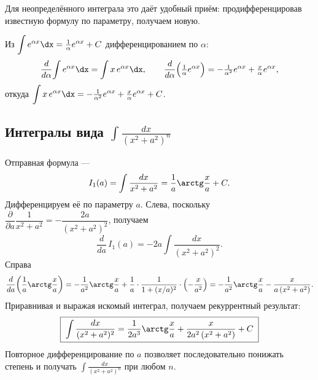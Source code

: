 \noindent Для неопределённого интеграла это даёт удобный приём: продифференцировав известную формулу
по параметру, получаем новую.

\begin{example}
Из $\displaystyle\int e^{\alpha x}\dx=\tfrac1\alpha e^{\alpha x}+C$ дифференцированием по $\alpha$:
\[
  \frac{d}{d\alpha}\!\int e^{\alpha x}\dx=\int x\,e^{\alpha x}\dx,
  \qquad
  \frac{d}{d\alpha}\Bigl(\tfrac1\alpha e^{\alpha x}\Bigr)=-\tfrac1{\alpha^2}e^{\alpha x}+\tfrac{x}{\alpha}e^{\alpha x},
\]
откуда $\displaystyle\int x\,e^{\alpha x}\dx=-\tfrac1{\alpha^2}e^{\alpha x}+\tfrac{x}{\alpha}e^{\alpha x}+C$.
\end{example}

\subsection{Интегралы вида $\displaystyle\int\frac{dx}{(x^2+a^2)^n}$}
Отправная формула —
\[
  I_1(a)=\int\frac{dx}{x^2+a^2}=\frac1a\arctg\frac xa+C .
\]
Дифференцируем её по параметру $a$. Слева, поскольку
$\dfrac{\partial}{\partial a}\dfrac{1}{x^2+a^2}=-\dfrac{2a}{(x^2+a^2)^2}$, получаем
\[
  \frac{d}{da}\,I_1(a)=-2a\int\frac{dx}{(x^2+a^2)^2}.
\]
Справа
\[
  \frac{d}{da}\!\left(\frac1a\arctg\frac xa\right)
   =-\frac1{a^2}\arctg\frac xa+\frac1a\cdot\frac{1}{1+(x/a)^2}\cdot\Bigl(-\frac{x}{a^2}\Bigr)
   =-\frac1{a^2}\arctg\frac xa-\frac{x}{a\,(x^2+a^2)} .
\]
Приравнивая и выражая искомый интеграл, получаем рекуррентный результат:
\[
  \boxed{\;\int\frac{dx}{(x^2+a^2)^2}
   =\frac{1}{2a^3}\arctg\frac xa+\frac{x}{2a^2\,(x^2+a^2)}+C\;}
\]
Повторное дифференцирование по $a$ позволяет последовательно понижать степень и получать
$\displaystyle\int\frac{dx}{(x^2+a^2)^n}$ при любом $n$.
